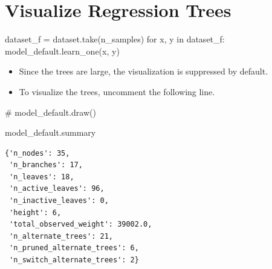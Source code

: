 \documentclass[
  letterpaper,
  DIV=11,
  numbers=noendperiod]{scrreprt}
\newenvironment{Shaded}{\begin{snugshade}}{\end{snugshade}}
\newcommand{\CommentTok}[1]{\textcolor[rgb]{0.37,0.37,0.37}{#1}}
\newcommand{\ControlFlowTok}[1]{\textcolor[rgb]{0.00,0.23,0.31}{#1}}
\newcommand{\KeywordTok}[1]{\textcolor[rgb]{0.00,0.23,0.31}{#1}}
\newcommand{\NormalTok}[1]{\textcolor[rgb]{0.00,0.23,0.31}{#1}}
\newcommand{\OperatorTok}[1]{\textcolor[rgb]{0.37,0.37,0.37}{#1}}
\providecommand{\tightlist}{%
  \setlength{\itemsep}{0pt}\setlength{\parskip}{0pt}}\usepackage{longtable,booktabs,array}
\begin{document}
\hypertarget{visualize-regression-trees}{%
\section{Visualize Regression Trees}\label{visualize-regression-trees}}

\begin{Shaded}
\begin{Highlighting}[]
\NormalTok{dataset\_f }\OperatorTok{=}\NormalTok{ dataset.take(n\_samples)}
\ControlFlowTok{for}\NormalTok{ x, y }\KeywordTok{in}\NormalTok{ dataset\_f:}
\NormalTok{    model\_default.learn\_one(x, y)}
\end{Highlighting}
\end{Shaded}

\begin{tcolorbox}[enhanced jigsaw, rightrule=.15mm, opacityback=0, colframe=quarto-callout-caution-color-frame, opacitybacktitle=0.6, toptitle=1mm, arc=.35mm, colbacktitle=quarto-callout-caution-color!10!white, coltitle=black, toprule=.15mm, leftrule=.75mm, titlerule=0mm, title=\textcolor{quarto-callout-caution-color}{\faFire}\hspace{0.5em}{Caution: Large Trees}, bottomrule=.15mm, breakable, bottomtitle=1mm, left=2mm, colback=white]

\begin{itemize}
\tightlist
\item
  Since the trees are large, the visualization is suppressed by default.
\item
  To visualize the trees, uncomment the following line.
\end{itemize}

\end{tcolorbox}

\begin{Shaded}
\begin{Highlighting}[]
\CommentTok{\# model\_default.draw()}
\end{Highlighting}
\end{Shaded}

\begin{Shaded}
\begin{Highlighting}[]
\NormalTok{model\_default.summary}
\end{Highlighting}
\end{Shaded}

\begin{verbatim}
{'n_nodes': 35,
 'n_branches': 17,
 'n_leaves': 18,
 'n_active_leaves': 96,
 'n_inactive_leaves': 0,
 'height': 6,
 'total_observed_weight': 39002.0,
 'n_alternate_trees': 21,
 'n_pruned_alternate_trees': 6,
 'n_switch_alternate_trees': 2}
\end{verbatim}
\end{document}
